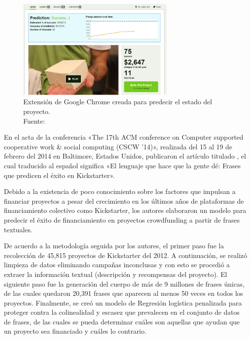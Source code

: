 \begin{figure}[!ht]
	\begin{center}
		\includegraphics[width=0.7\textwidth]{2/figures/chen2013.jpg}
		\caption[Extensión de Google Chrome creada para predecir el estado del proyecto]{Extensión de Google Chrome creada para predecir el estado del proyecto.\\
			Fuente: \cite{pr_chen2013kickpredict}}
		\label{2:fig111}
	\end{center}
\end{figure}

En el acta de la conferencia «The 17th ACM conference on Computer supported cooperative work \& social computing (CSCW '14)», realizada del 15 al 19 de febrero del 2014 en Baltimore, Estados Unidos, \cite{pr_mitra2014phrases} publicaron el artículo titulado , el cual traducido al español significa «El lenguaje que hace que la gente dé: Frases que predicen el éxito en Kickstarter».

Debido a la existencia de poco conocimiento sobre los factores que impulsan a financiar proyectos a pesar del crecimiento en los últimos años de plataformas de financiamiento colectivo como Kickstarter, los autores elaboraron un modelo para predecir el éxito de financiamiento en proyectos crowdfunding a partir de frases textuales.

De acuerdo a la metodología seguida por los autores, el primer paso fue la recolección de 45,815 proyectos de Kickstarter del 2012. A continuación, se realizó limpieza de datos eliminando campañas inconclusas y con esto se procedió a extraer la información textual (descripción y recompensas del proyecto). El siguiente paso fue la generación del cuerpo de más de 9 millones de frases únicas, de las cuales quedaron 20,391 frases que aparecen al menos 50 veces en todos los proyectos. Finalmente, se creó un modelo de Regresión logística penalizada para proteger contra la colinealidad y escasez que prevalecen en el conjunto de datos de frases, de las cuales se pueda determinar cuáles son aquellas que ayudan que un proyecto sea financiado y cuáles lo contrario.

